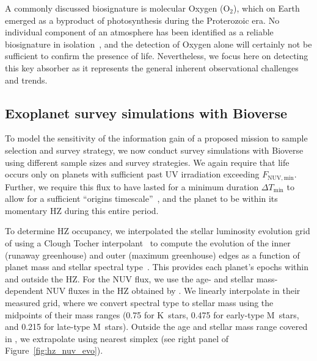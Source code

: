 \documentclass[modern,linenumbers]{aastex631}
\begin{document}
A commonly discussed biosignature is molecular Oxygen (O$_2$), which on Earth emerged as a byproduct of photosynthesis during the Proterozoic era.
No individual component of an atmosphere has been identified as a reliable biosignature in isolation~\citep{Seager2016}, and the detection of Oxygen alone will certainly not be sufficient to confirm the presence of life.
Nevertheless, we focus here on detecting this key absorber as it represents the general inherent observational challenges and trends.







\subsection{Exoplanet survey simulations with Bioverse}
To model the sensitivity of the information gain of a proposed mission to sample selection and survey strategy, we now conduct survey simulations with Bioverse using different sample sizes and survey strategies.
We again require that life occurs only on planets with sufficient past UV irradiation exceeding $F_\mathrm{NUV, min}$.
Further, we require this flux to have lasted for a minimum duration $\Delta T_\mathrm{min}$ to allow for a sufficient ``origins timescale''~\citep{Rimmer2023}, and the planet to be within its momentary \gls{HZ} during this entire period.

To determine \gls{HZ} occupancy, we interpolated the stellar luminosity evolution grid of \citet{Baraffe1998} using a Clough Tocher interpolant~\citep[][see left panel of Figure~\ref{fig:hz_nuv_evo}]{Nielson1983,Alfeld1984} to compute the evolution of the inner (runaway greenhouse) and outer (maximum greenhouse) edges as a function of planet mass and stellar spectral type~\citep{Kopparapu2014}.
This provides each planet's epochs within and outside the \gls{HZ}.
For the \gls{NUV} flux, we use the age- and stellar mass-dependent \gls{NUV} fluxes in the \gls{HZ} obtained by \citet{Richey-Yowell2023}.
We linearly interpolate in their measured grid, where we convert spectral type to stellar mass using the midpoints of their mass ranges (\SI{0.75}{\Msun} for K~stars, \SI{0.475}{\Msun} for early-type M~stars,  and \SI{0.215}{\Msun} for late-type M~stars).
Outside the age and stellar mass range covered in \citet{Richey-Yowell2023}, we extrapolate using nearest simplex (see right panel of Figure~\ref{fig:hz_nuv_evo}).
\end{document}
